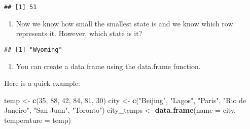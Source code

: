 \documentclass[]{article}
\newenvironment{Shaded}{\begin{snugshade}}{\end{snugshade}}
\newcommand{\CommentTok}[1]{\textcolor[rgb]{0.56,0.35,0.01}{\textit{#1}}}
\newcommand{\DataTypeTok}[1]{\textcolor[rgb]{0.13,0.29,0.53}{#1}}
\newcommand{\DecValTok}[1]{\textcolor[rgb]{0.00,0.00,0.81}{#1}}
\newcommand{\KeywordTok}[1]{\textcolor[rgb]{0.13,0.29,0.53}{\textbf{#1}}}
\newcommand{\NormalTok}[1]{#1}
\newcommand{\OperatorTok}[1]{\textcolor[rgb]{0.81,0.36,0.00}{\textbf{#1}}}
\newcommand{\StringTok}[1]{\textcolor[rgb]{0.31,0.60,0.02}{#1}}
\providecommand{\tightlist}{%
  \setlength{\itemsep}{0pt}\setlength{\parskip}{0pt}}
\begin{document}
\begin{verbatim}
## [1] 51
\end{verbatim}

\begin{enumerate}
\def\labelenumi{\arabic{enumi}.}
\setcounter{enumi}{3}
\tightlist
\item
  Now we know how small the smallest state is and we know which row
  represents it. However, which state is it?
\end{enumerate}

\begin{Shaded}
\end{Shaded}

\begin{verbatim}
## [1] "Wyoming"
\end{verbatim}

\begin{enumerate}
\def\labelenumi{\arabic{enumi}.}
\setcounter{enumi}{4}
\tightlist
\item
  You can create a data frame using the data.frame function.
\end{enumerate}

Here is a quick example:

\begin{Shaded}
\begin{Highlighting}[]
\NormalTok{temp <-}\StringTok{ }\KeywordTok{c}\NormalTok{(}\DecValTok{35}\NormalTok{, }\DecValTok{88}\NormalTok{, }\DecValTok{42}\NormalTok{, }\DecValTok{84}\NormalTok{, }\DecValTok{81}\NormalTok{, }\DecValTok{30}\NormalTok{)}
\NormalTok{city <-}\StringTok{ }\KeywordTok{c}\NormalTok{(}\StringTok{"Beijing"}\NormalTok{, }\StringTok{"Lagos"}\NormalTok{, }\StringTok{"Paris"}\NormalTok{, }\StringTok{"Rio de Janeiro"}\NormalTok{, }\StringTok{"San Juan"}\NormalTok{, }\StringTok{"Toronto"}\NormalTok{)}
\NormalTok{city_temps <-}\StringTok{ }\KeywordTok{data.frame}\NormalTok{(}\DataTypeTok{name =}\NormalTok{ city, }\DataTypeTok{temperature =}\NormalTok{ temp)}
\end{Highlighting}
\end{Shaded}
\end{document}
